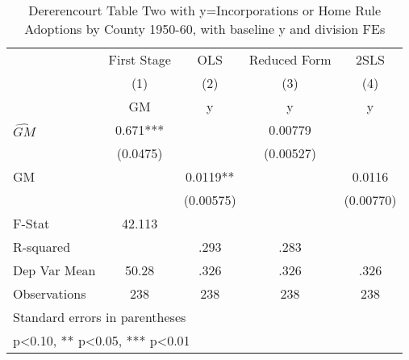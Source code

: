 \begin{table}[htbp]\centering
\def\sym#1{\ifmmode^{#1}\else\(^{#1}\)\fi}
\caption{Dererencourt Table Two with y=Incorporations or Home Rule Adoptions by County 1950-60, with baseline y and division FEs}
\begin{tabular}{l*{4}{c}}
\toprule
                    & First Stage   &         OLS   &Reduced Form   &        2SLS   \\
                    &\multicolumn{1}{c}{(1)}&\multicolumn{1}{c}{(2)}&\multicolumn{1}{c}{(3)}&\multicolumn{1}{c}{(4)}\\
                    &\multicolumn{1}{c}{GM}&\multicolumn{1}{c}{y}&\multicolumn{1}{c}{y}&\multicolumn{1}{c}{y}\\
\midrule
$\hat{GM}$          &       0.671***&               &     0.00779   &               \\
                    &    (0.0475)   &               &   (0.00527)   &               \\
\addlinespace
GM                  &               &      0.0119** &               &      0.0116   \\
                    &               &   (0.00575)   &               &   (0.00770)   \\
\midrule
F-Stat              &      42.113   &               &               &               \\
R-squared           &               &        .293   &        .283   &               \\
Dep Var Mean        &       50.28   &        .326   &        .326   &        .326   \\
Observations        &         238   &         238   &         238   &         238   \\
\bottomrule
\multicolumn{5}{l}{\footnotesize Standard errors in parentheses}\\
\multicolumn{5}{l}{\footnotesize * p<0.10, ** p<0.05, *** p<0.01}\\
\end{tabular}
\end{table}
